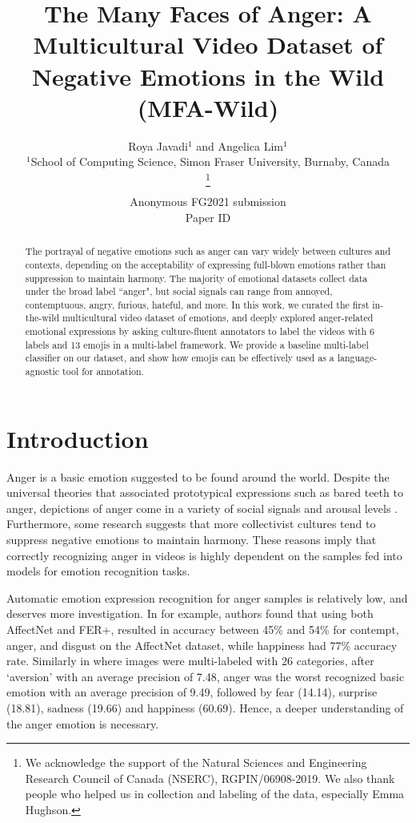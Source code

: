 \documentclass[letterpaper, 10 pt, conference]{ieeeconf}  \usepackage{FG2021}
\title{\LARGE \bf
The Many Faces of Anger: A Multicultural Video Dataset of Negative Emotions in the Wild (MFA-Wild)
}
\author{\parbox{16cm}{\centering
    {\large Roya Javadi$^1$ and Angelica Lim$^1$}\\
    {\normalsize
    $^1$School of Computing Science, Simon Fraser University, Burnaby, Canada}}
    \thanks{We acknowledge the support of the Natural Sciences and Engineering Research Council of Canada (NSERC), RGPIN/06908-2019. We also thank people who helped us in collection and labeling of the data, especially Emma Hughson.}}
\begin{document}
\ifFGfinal
\thispagestyle{empty}
\pagestyle{empty}
\else
\author{Anonymous FG2021 submission\\ Paper ID \FGPaperID \\}
\pagestyle{plain}
\fi
\maketitle



\begin{abstract}

The portrayal of negative emotions such as anger can vary widely between cultures and contexts, depending on the acceptability of expressing full-blown emotions rather than suppression to maintain harmony. The majority of emotional datasets collect data under the broad label ``anger", but social signals can range from annoyed, contemptuous, angry, furious, hateful, and more. In this work, we curated the first in-the-wild multicultural video dataset of emotions, and deeply explored anger-related emotional expressions by asking culture-fluent annotators to label the videos with 6 labels and 13 emojis in a multi-label framework. We provide a baseline multi-label classifier on our dataset, and show how emojis can be effectively used as a language-agnostic tool for annotation.



\end{abstract}


\section{Introduction}

Anger is a basic emotion suggested to be found around the world. Despite the universal theories that associated prototypical expressions such as bared teeth to anger, depictions of anger come in a variety of social signals and arousal levels \cite{cite1}.  Furthermore, some research \cite{cite2, cite3, cite4} suggests that more collectivist cultures tend to suppress negative emotions to maintain harmony. These reasons imply that correctly recognizing anger in videos is highly dependent on the samples fed into models for emotion recognition tasks. 

Automatic emotion expression recognition for anger samples is relatively low, and deserves more investigation. In \cite{siqueira2020efficient} for example, authors found that using both AffectNet and FER+, resulted in accuracy between 45\% and 54\% for contempt, anger, and disgust on the AffectNet dataset, while happiness had 77\% accuracy rate. Similarly in \cite{Kosti_2019} where images were multi-labeled with 26 categories, after `aversion' with an average precision of 7.48, anger was the worst recognized basic emotion with an average precision of 9.49, followed by fear (14.14), surprise (18.81), sadness (19.66) and happiness (60.69). Hence, a deeper understanding of the anger emotion is necessary.
\end{document}
